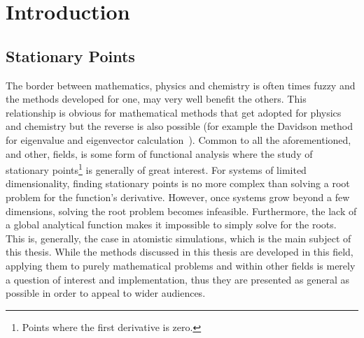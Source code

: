 \chapter{Introduction}
\label{chap:introduction}


\section{Stationary Points}
The border between mathematics, physics and chemistry is often times fuzzy and the methods developed for one, may very well benefit the others.
This relationship is obvious for mathematical methods that get adopted for physics and chemistry but the reverse is also possible (for example the Davidson method for eigenvalue and eigenvector calculation~\cite{davidson-method-1975}).
Common to all the aforementioned, and other, fields, is some form of functional analysis where the study of stationary points\footnote{Points where the first derivative is zero.} is generally of great interest.
For systems of limited dimensionality, finding stationary points is no more complex than solving a root problem for the function's derivative.
However, once systems grow beyond a few dimensions, solving the root problem becomes infeasible.
Furthermore, the lack of a global analytical function makes it impossible to simply solve for the roots.
This is, generally, the case in atomistic simulations, which is the main subject of this thesis.
While the methods discussed in this thesis are developed in this field, applying them to purely mathematical problems and within other fields is merely a question of interest and implementation, thus they are presented as general as possible in order to appeal to wider audiences.

